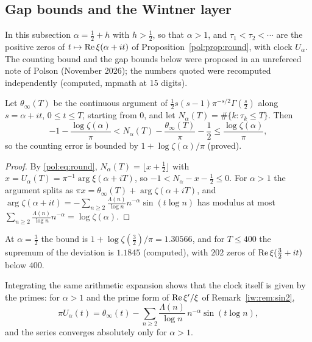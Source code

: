 \subsection{Gap bounds and the Wintner layer}\label{pol:sec:gaps}

In this subsection $\alpha=\frac12+h$ with $h>\frac12$, so that $\alpha>1$, and $\tau_1<\tau_2<\cdots$ are the positive zeros of $t\mapsto\operatorname{Re}\xi(\alpha+it)$ of Proposition~\ref{pol:prop:round}, with clock $U_\alpha$. The counting bound and the gap bounds below were proposed in an unrefereed note of Polson (November 2026); the numbers quoted were recomputed independently (computed, mpmath at 15 digits).

\begin{proposition}\label{pol:prop:count}
Let $\theta_\infty(T)$ be the continuous argument of $\frac12s(s-1)\pi^{-s/2}\Gamma(\frac s2)$ along $s=\alpha+it$, $0\le t\le T$, starting from $0$, and let $N_\alpha(T)=\#\{k:\tau_k\le T\}$. Then
\[
-1-\frac{\log\zeta(\alpha)}\pi<N_\alpha(T)-\frac{\theta_\infty(T)}\pi-\frac12\le\frac{\log\zeta(\alpha)}\pi ,
\]
so the counting error is bounded by $1+\log\zeta(\alpha)/\pi$ (proved).
\end{proposition}

\begin{proof}
By \eqref{pol:eq:round}, $N_\alpha(T)=\lfloor x+\frac12\rfloor$ with $x=U_\alpha(T)=\pi^{-1}\arg\xi(\alpha+iT)$, so $-1<N_\alpha-x-\frac12\le0$. For $\alpha>1$ the argument splits as $\pi x=\theta_\infty(T)+\arg\zeta(\alpha+iT)$, and $\arg\zeta(\alpha+it)=-\sum_{n\ge2}\frac{\Lambda(n)}{\log n}n^{-\alpha}\sin(t\log n)$ has modulus at most $\sum_{n\ge2}\frac{\Lambda(n)}{\log n}n^{-\alpha}=\log\zeta(\alpha)$.
\end{proof}

At $\alpha=\frac32$ the bound is $1+\log\zeta(\frac32)/\pi=1.30566$, and for $T\le400$ the supremum of the deviation is $1.1845$ (computed), with $202$ zeros of $\operatorname{Re}\xi(\frac32+it)$ below $400$.

Integrating the same arithmetic expansion shows that the clock itself is given by the primes: for $\alpha>1$ and the prime form of $\operatorname{Re}\xi'/\xi$ of Remark~\ref{iw:rem:sin2},
\begin{equation}\label{pol:eq:primephase}
\pi U_\alpha(t)=\theta_\infty(t)-\sum_{n\ge2}\frac{\Lambda(n)}{\log n}\,n^{-\alpha}\sin(t\log n),
\end{equation}
and the series converges absolutely only for $\alpha>1$.

